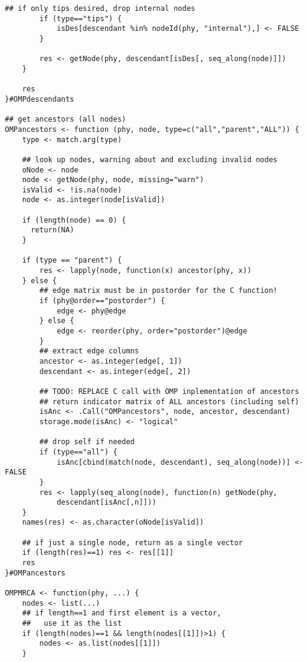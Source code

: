 \documentclass[11pt,letterpaper]{article}
\begin{document}
\begin{lstlisting}[style=MyR]
        ## if only tips desired, drop internal nodes
        if (type=="tips") {
            isDes[descendant %in% nodeId(phy, "internal"),] <- FALSE
        }
        
        res <- getNode(phy, descendant[isDes[, seq_along(node)]])
    }

    res
}#OMPdescendants

## get ancestors (all nodes)
OMPancestors <- function (phy, node, type=c("all","parent","ALL")) {
    type <- match.arg(type)

    ## look up nodes, warning about and excluding invalid nodes
    oNode <- node
    node <- getNode(phy, node, missing="warn")
    isValid <- !is.na(node)
    node <- as.integer(node[isValid])

    if (length(node) == 0) {
      return(NA)
    }
    
    if (type == "parent") {
        res <- lapply(node, function(x) ancestor(phy, x))
    } else {
        ## edge matrix must be in postorder for the C function!
        if (phy@order=="postorder") {
            edge <- phy@edge
        } else {
            edge <- reorder(phy, order="postorder")@edge
        }
        ## extract edge columns
        ancestor <- as.integer(edge[, 1])
        descendant <- as.integer(edge[, 2])
        
        ## TODO: REPLACE C call with OMP inplementation of ancestors
        ## return indicator matrix of ALL ancestors (including self)
        isAnc <- .Call("OMPancestors", node, ancestor, descendant)
        storage.mode(isAnc) <- "logical"

        ## drop self if needed
        if (type=="all") {
            isAnc[cbind(match(node, descendant), seq_along(node))] <- FALSE
        }
        res <- lapply(seq_along(node), function(n) getNode(phy,
            descendant[isAnc[,n]]))
    }
    names(res) <- as.character(oNode[isValid])

    ## if just a single node, return as a single vector
    if (length(res)==1) res <- res[[1]]
    res
}#OMPancestors

OMPMRCA <- function(phy, ...) {
    nodes <- list(...)
    ## if length==1 and first element is a vector,
    ##   use it as the list
    if (length(nodes)==1 && length(nodes[[1]])>1) {
        nodes <- as.list(nodes[[1]])
    }


\end{lstlisting}
\end{document}
